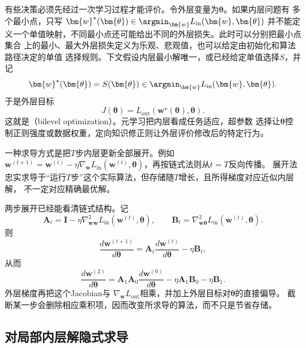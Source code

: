 有些决策必须先经过一次学习过程才能评价。令外层变量为$\bm{\theta}$。如果内层问题有
多个最小点，只写
$\bm{w}^{\star}(\bm{\theta})\in
\argmin_{\bm{w}}L_{\mathrm{in}}(\bm{w},\bm{\theta})$
并不能定义一个单值映射，不同最小点还可能给出不同的外层损失。此时可以分别把最小点集合
上的最小、最大外层损失定义为乐观、悲观值，也可以给定由初始化和算法路径决定的单值
选择规则。下文假设内层最小解唯一，或已经给定单值选择$S$，并记
\[
  \bm{w}^{\star}(\bm{\theta})=S(\bm{\theta})
  \in\argmin_{\bm{w}}L_{\mathrm{in}}(\bm{w},\bm{\theta}).
\]
于是外层目标
\begin{equation}
  J(\bm{\theta})
  =L_{\mathrm{out}}(\bm{w}^{\star}(\bm{\theta}),\bm{\theta}).
  \label{eq:opt-bilevel-objective}
\end{equation}
这就是（bilevel optimization）。元学习把内层看成任务适应，超参数
选择让$\bm{\theta}$控制正则强度或数据权重，定向知识修正则让外层评价修改后的特定行为。

一种求导方式是把$T$步内层更新全部展开。例如
$\bm{w}^{(t+1)}=\bm{w}^{(t)}-\eta\nabla_{\bm{w}}
L_{\mathrm{in}}(\bm{w}^{(t)},\bm{\theta})$，再按链式法则从$t=T$反向传播。
展开法忠实求导于“运行$T$步”这个实际算法，但存储随$T$增长，且所得梯度对应近似内层解，
不一定对应精确最优解。

两步展开已经能看清链式结构。记
\[
  \bm{A}_t=\bm{I}-\eta\nabla_{\bm{w}\bm{w}}^2
  L_{\mathrm{in}}(\bm{w}^{(t)},\bm{\theta}),\qquad
  \bm{B}_t=\nabla_{\bm{w}\bm{\theta}}^2
  L_{\mathrm{in}}(\bm{w}^{(t)},\bm{\theta}).
\]
则
\[
  \frac{d\bm{w}^{(t+1)}}{d\bm{\theta}}
  =\bm{A}_t\frac{d\bm{w}^{(t)}}{d\bm{\theta}}-\eta\bm{B}_t,
\]
从而
\[
  \frac{d\bm{w}^{(2)}}{d\bm{\theta}}
  =\bm{A}_1\bm{A}_0\frac{d\bm{w}^{(0)}}{d\bm{\theta}}
  -\eta\bm{A}_1\bm{B}_0-\eta\bm{B}_1.
\]
外层梯度再把这个Jacobian与
$\nabla_{\bm{w}}L_{\mathrm{out}}$相乘，并加上外层目标对$\bm{\theta}$的直接偏导。
截断某一步会删除相应乘积项，因而改变所求导的算法，而不只是节省存储。

\subsection{对局部内层解隐式求导}

